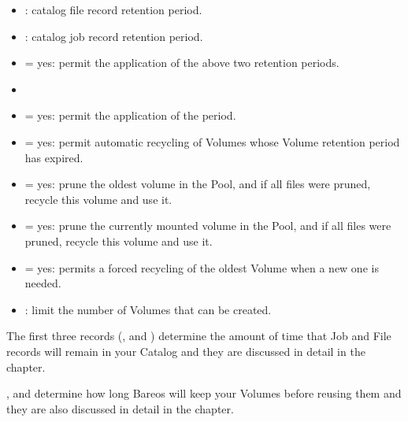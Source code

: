 \begin{itemize}
\item {}: catalog file record retention period.
\item {}: catalog job record retention period.
\item {} = yes: permit the application of the above two retention periods.
\item {}
\item {} = yes: permit the application of the  period.
\item {} = yes: permit automatic recycling of Volumes whose Volume retention period has
   expired.
\item {} = yes: prune the oldest volume in the Pool, and if all
   files  were pruned, recycle this volume and use it.
\item {} = yes: prune the currently mounted volume in the
   Pool, and if all files  were pruned, recycle this volume and use it.
\item {} = yes: permits a forced recycling of the oldest Volume when a new one
   is  needed.\\
\item {}: limit the number of Volumes that can be created.
\end{itemize}

The first three records
(,  and )
determine the amount of time that Job and File records will remain in your
Catalog and they are discussed in detail in the
 chapter.

,  and 
determine how long Bareos will keep
your Volumes before reusing them and they are also discussed in detail in the
 chapter.

